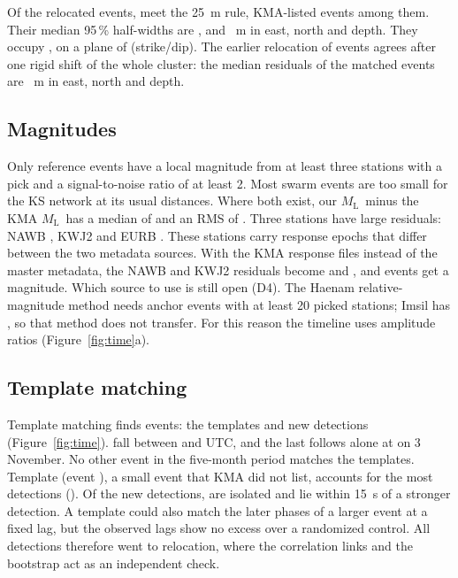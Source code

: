 \documentclass[11pt,a4paper]{article}
\newcommand{\ML}{\ensuremath{M_\mathrm{L}}}
\newcommand{\figref}[1]{Figure~\ref{#1}}
\begin{document}
Of the  relocated events,  meet the 25~m rule,  KMA-listed events among them. Their median 95\,\% half-widths are ,  and ~m in east, north and depth. They occupy , on a plane of  (strike/dip). The earlier relocation of  events agrees after one rigid shift of the whole cluster: the median residuals of the  matched events are ~m in east, north and depth.

\subsection{Magnitudes}

Only  reference events have a local magnitude from at least three stations with a pick and a signal-to-noise ratio of at least 2. Most swarm events are too small for the KS network at its usual distances. Where both exist, our \ML\ minus the KMA \ML\ has a median of  and an RMS of . Three stations have large residuals: NAWB , KWJ2  and EURB . These stations carry response epochs that differ between the two metadata sources. With the KMA response files instead of the master metadata, the NAWB and KWJ2 residuals become  and , and  events get a magnitude. Which source to use is still open (D4). The Haenam relative-magnitude method needs anchor events with at least 20 picked stations; Imsil has , so that method does not transfer. For this reason the timeline uses amplitude ratios (\figref{fig:time}a).

\subsection{Template matching}

Template matching finds  events: the  templates and  new detections (\figref{fig:time}).  fall between  and  UTC, and the last follows alone at  on 3 November. No other event in the five-month period matches the templates. Template  (event ), a small event that KMA did not list, accounts for the most detections (). Of the new detections,  are isolated and  lie within 15~s of a stronger detection. A template could also match the later phases of a larger event at a fixed lag, but the observed lags show no excess over a randomized control. All detections therefore went to relocation, where the correlation links and the bootstrap act as an independent check.
\end{document}
